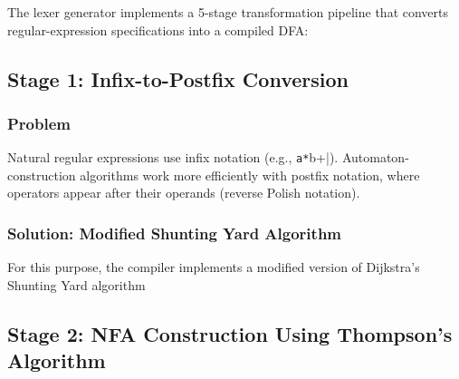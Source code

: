 \documentclass[12pt,a4paper]{report}
\begin{document}
The lexer generator implements a 5-stage transformation pipeline that converts regular-expression specifications into a compiled DFA:

\begin{center}
\end{center}

\subsection{Stage 1: Infix-to-Postfix Conversion}

\subsubsection{Problem}
Natural regular expressions use infix notation (e.g., \verb|a*|b+|).
Automaton-construction algorithms work more efficiently with postfix notation, where operators appear after their operands (reverse Polish notation).

\subsubsection{Solution: Modified Shunting Yard Algorithm}

For this purpose, the compiler implements a modified version of Dijkstra's Shunting Yard algorithm


\subsection{Stage 2: NFA Construction Using Thompson's Algorithm}
\end{document}
